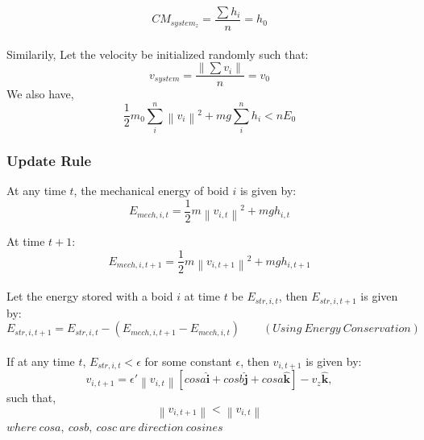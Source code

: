 \documentclass[a4paper]{article}
\newcommand\norm[1]{\left\lVert#1\right\rVert}
\newcommand{\uvec}[1]{\boldsymbol{\hat{{#1}}}}
\begin{document}
\[ CM_{system_{z}} = \frac{\sum h_{i}}{n} = h_{0}\]
\\
\noindent Similarily, Let the velocity be initialized randomly such that:
\[ v_{system} = \frac{\norm{\sum v_{i}}}{n} = v_{0} \] 
We also have,
\[ \frac{1}{2} m_{0} \sum_{i}^n \norm{v_{i}}^2 + mg \sum_{i}^n h_{i} < nE_{0} \]


\subsubsection{Update Rule}

\noindent At any time $t$, the mechanical energy of boid $i$ is given by:
\[E_{mech, i, t} = \frac{1}{2} m \norm{v_{i, t}}^2 + mgh_{i,t}\] 

\noindent At time $t+1$:
\[E_{mech, i, t+1} = \frac{1}{2} m \norm{v_{i, t+1}}^2 + mgh_{i, t+1}\] 
\\
\noindent Let the energy stored with a boid $i$ at time $t$ be $E_{str, i, t}$, then $E_{str, i, t+1}$ is given by:
\\
\[ E_{str, i, t+1} = E_{str, i, t} - (E_{mech, i, t+1} - E_{mech, i, t}) \qquad (Using\ Energy\ Conservation) \]
\\
\noindent If at any time $t$, $E_{str, i, t} < \epsilon$ for some constant $\epsilon$, then $v_{i,t+1}$ is given by:
\[ v_{i,t+1} = \epsilon' \norm{v_{i,t}}[cosa \uvec{i} + cosb \uvec{j} + cosa \uvec{k}] - v_{z} \uvec{k}, \]
such that,
\[ \norm{v_{i,t+1}} < \norm{v_{i,t}} \] 
$where \ cosa,\ cosb,\ cosc\ are\ direction\ cosines$
%
%
%
%
%
%
%
%
%
\end{document}
